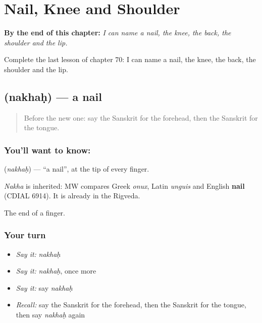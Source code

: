 
\chapter{Nail, Knee and Shoulder}
\label{ch:sa-nail-knee-shoulder}

\begin{chapteropening}
\textbf{By the end of this chapter:} \emph{I can name a nail, the knee, the back, the shoulder and the lip.}

Complete the last lesson of chapter 70: I can name a nail, the knee, the back, the shoulder and the lip.
\end{chapteropening}

\section[\texorpdfstring{\sk{नखः} (nakhaḥ)}{नखः (nakhaḥ)}]{ (nakhaḥ) — a nail}

\label{lesson:SA-C70-nail}



\begin{quote}
Before the new one: say the Sanskrit for the forehead, then the Sanskrit for the tongue.
\end{quote}

\subsection*{You'll want to know: }
\textbf{} (\emph{nakhaḥ}) — \textquotedblleft{}a nail\textquotedblright{}, at the tip of every finger.

\begin{cousinweb}
\emph{Nakha} is inherited: MW compares Greek \emph{onux}, Latin \emph{unguis} and English \textbf{nail} (CDIAL 6914). It is already in the Rigveda.
\end{cousinweb}

\begin{grammarlens}[title={What you've built}]
The end of a finger.
\end{grammarlens}

\subsection*{Your turn}
\begin{itemize}
\raggedright
  \item \emph{Say it:} \emph{nakhaḥ}
  \item \emph{Say it:} \emph{nakhaḥ}, once more
  \item \emph{Say it:} say \emph{nakhaḥ}
  \item \emph{Recall:} say the Sanskrit for the forehead, then the Sanskrit for the tongue, then say \emph{nakhaḥ} again
\end{itemize}

